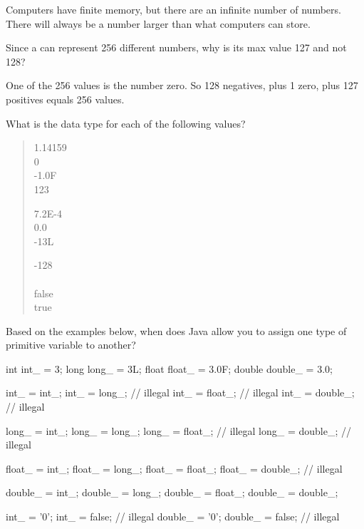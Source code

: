 \begin{answer}
Computers have finite memory, but there are an infinite number of numbers.
There will always be a number larger than what computers can store.
\end{answer}


\Q Since a  can represent 256 different numbers, why is its max value 127 and not 128?

\begin{answer}
One of the 256 values is the number zero. So 128 negatives, plus 1 zero, plus 127 positives equals 256 values.
\end{answer}


\Q What is the data type for each of the following values?

\begin{quote}
\begin{multicols}{3}
1.14159      \\[1ex]
0               \\[1ex]
-1.0F         \\[1ex]
123        

7.2E-4       \\[1ex]
0.0          \\[1ex]
-13L           \\[1ex]
\qs  {}

-128            \\[1ex]
\qs  {}    \\[1ex]
false       \\[1ex]
true       
\end{multicols}
\end{quote}


\Q \label{allow} Based on the examples below, when does Java allow you to assign one type of primitive variable to another?

\begin{multicols}{2}
\begin{javalst}
    int int_ = 3;
    long long_ = 3L;
    float float_ = 3.0F;
    double double_ = 3.0;
    
    int_ = int_;
    int_ = long_;      // illegal
    int_ = float_;     // illegal
    int_ = double_;    // illegal
    
    long_ = int_;
    long_ = long_;
    long_ = float_;    // illegal
    long_ = double_;   // illegal

    float_ = int_;
    float_ = long_;
    float_ = float_;
    float_ = double_;  // illegal
    
    double_ = int_;
    double_ = long_;
    double_ = float_;
    double_ = double_;
    
    int_ = '0';
    int_ = false;      // illegal
    double_ = '0';
    double_ = false;   // illegal
\end{javalst}
\end{multicols}


